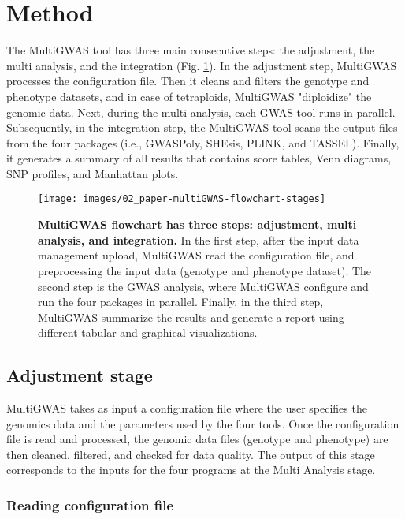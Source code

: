 \documentclass{article}
\begin{document}
\section{Method}

The MultiGWAS tool has three main consecutive steps: the adjustment, the multi analysis, and the integration (Fig. \ref{fig: Pipeline}). In the adjustment step, MultiGWAS processes the configuration file. Then it cleans and filters the genotype and phenotype datasets, and in case of tetraploids,  MultiGWAS "diploidize" the genomic data. Next, during the multi analysis, each GWAS tool runs in parallel. Subsequently, in the integration step, the MultiGWAS tool scans the output files from the four packages (i.e., GWASPoly, SHEsis, PLINK, and TASSEL). Finally, it generates a summary of all results that contains score tables, Venn diagrams, SNP profiles, and Manhattan plots. 
\begin{figure}
\centering{}\texttt{[image: images/02\_paper-multiGWAS-flowchart-stages]} \caption{\textbf{MultiGWAS flowchart has three steps: adjustment, multi analysis, and integration.} In the first step, after the input data management upload, MultiGWAS read the configuration file, and preprocessing the input data (genotype and phenotype dataset). The second step is the GWAS analysis, where MultiGWAS configure and run the four packages in parallel. Finally, in the third step, MultiGWAS summarize the results and generate a report using different tabular and graphical visualizations.\label{fig: Pipeline}}
\end{figure}

\subsection{Adjustment stage}

MultiGWAS takes as input a configuration file where the user specifies the genomics data and the parameters used by the four tools. Once the configuration file is read and processed, the genomic data files (genotype and phenotype) are then cleaned, filtered, and checked for data quality. The output of this stage corresponds to the inputs for the four programs at the Multi Analysis stage.


\subsubsection{Reading configuration file\label{section-Reading-configuration-file}}
\end{document}
